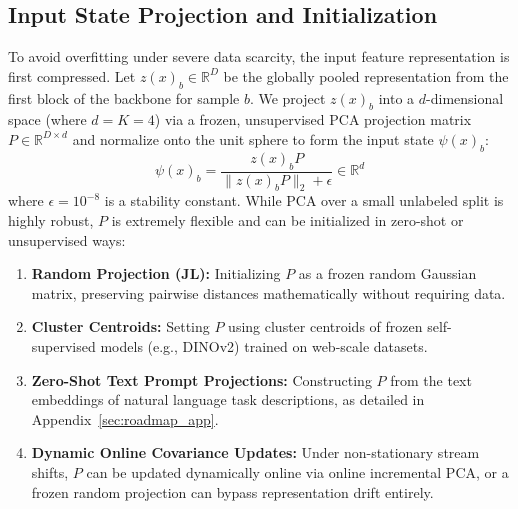 \subsection{Input State Projection and Initialization}
To avoid overfitting under severe data scarcity, the input feature representation is first compressed. Let $z(x)_b \in \mathbb{R}^D$ be the globally pooled representation from the first block of the backbone for sample $b$. We project $z(x)_b$ into a $d$-dimensional space (where $d = K = 4$) via a frozen, unsupervised PCA projection matrix $P \in \mathbb{R}^{D \times d}$ and normalize onto the unit sphere to form the input state $\psi(x)_b$:
\begin{equation}
    \psi(x)_b = \frac{z(x)_b P}{\|z(x)_b P\|_2 + \epsilon} \in \mathbb{R}^d
\end{equation}
where $\epsilon = 10^{-8}$ is a stability constant. While PCA over a small unlabeled split is highly robust, $P$ is extremely flexible and can be initialized in zero-shot or unsupervised ways:
\begin{enumerate}
    \item \textbf{Random Projection (JL):} Initializing $P$ as a frozen random Gaussian matrix, preserving pairwise distances mathematically without requiring data.
    \item \textbf{Cluster Centroids:} Setting $P$ using cluster centroids of frozen self-supervised models (e.g., DINOv2) trained on web-scale datasets.
    \item \textbf{Zero-Shot Text Prompt Projections:} Constructing $P$ from the text embeddings of natural language task descriptions, as detailed in Appendix~\ref{sec:roadmap_app}.
    \item \textbf{Dynamic Online Covariance Updates:} Under non-stationary stream shifts, $P$ can be updated dynamically online via online incremental PCA, or a frozen random projection can bypass representation drift entirely.
\end{enumerate}

